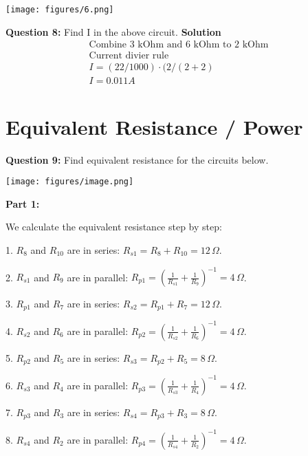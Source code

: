 \documentclass{article}
\begin{document}
\begin{center}
\texttt{[image: figures/6.png]}
\end{center}

\textbf{Question 8:} Find I in the above circuit.
\textbf{Solution
}
\begin{align*}
    \text{Combine 3 kOhm and 6 kOhm to 2 kOhm}\\
    \text{Current divier rule}\\ 
    I = (22/1000) \cdot(2/(2+2) \\
    \boxed{I = 0.011 A}
\end{align*}

\section*{Equivalent Resistance / Power}
\textbf{Question 9:} Find equivalent resistance for the circuits below.

\begin{center}

        \texttt{[image: figures/image.png]}
\end{center}

\textbf{Part 1:}

We calculate the equivalent resistance step by step:

1. \( R_8 \) and \( R_{10} \) are in series:  
   \( R_{s1} = R_8 + R_{10} = 12 \, \Omega \).

2. \( R_{s1} \) and \( R_9 \) are in parallel:  
   \( R_{p1} = \left( \frac{1}{R_{s1}} + \frac{1}{R_9} \right)^{-1} = 4 \, \Omega \).

3. \( R_{p1} \) and \( R_7 \) are in series:  
   \( R_{s2} = R_{p1} + R_7 = 12 \, \Omega \).

4. \( R_{s2} \) and \( R_6 \) are in parallel:  
   \( R_{p2} = \left( \frac{1}{R_{s2}} + \frac{1}{R_6} \right)^{-1} = 4 \, \Omega \).

5. \( R_{p2} \) and \( R_5 \) are in series:  
   \( R_{s3} = R_{p2} + R_5 = 8 \, \Omega \).

6. \( R_{s3} \) and \( R_4 \) are in parallel:  
   \( R_{p3} = \left( \frac{1}{R_{s3}} + \frac{1}{R_4} \right)^{-1} = 4 \, \Omega \).

7. \( R_{p3} \) and \( R_3 \) are in series:  
   \( R_{s4} = R_{p3} + R_3 = 8 \, \Omega \).

8. \( R_{s4} \) and \( R_2 \) are in parallel:  
   \( R_{p4} = \left( \frac{1}{R_{s4}} + \frac{1}{R_2} \right)^{-1} = 4 \, \Omega \).
\end{document}
